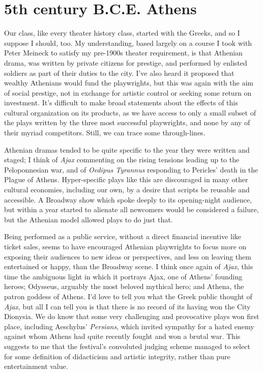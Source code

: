 \section*{5th century B.C.E. Athens}


Our class, like every theater history class, started with the Greeks, and so I suppose I
should, too. My understanding, based largely on a course I took with Peter Meineck to
satisfy my pre-1900s theater requirement, is that Athenian drama, was written by private
citizens for prestige, and performed by enlisted soldiers as part of their duties to the
city. I've also heard it proposed that wealthy Athenians would fund the playwrights, but
this was again with the aim of social prestige, not in exchange for artistic control or
seeking some return on investment. It's difficult to make broad statements about the
effects of this cultural organization on its products, as we have access to only a small
subset of the plays written by the three most successful playwrights, and none by any of
their myriad competitors. Still, we can trace some through-lines.

Athenian dramas tended to be quite specific to the year they were written and staged; I
think of \textit{Ajax} commenting on the rising tensions leading up to the Peloponnesian
war, and of \textit{Oedipus Tyrannus} responding to Pericles' death in the Plague of
Athens. Hyper-specific plays like this are discouraged in many other cultural economies,
including our own, by a desire that scripts be reusable and accessible. A Broadway show
which spoke deeply to its opening-night audience, but within a year started to alienate
all newcomers would be considered a failure, but the Athenian model allowed plays to do
just that.

Being performed as a public service, without a direct financial incentive like ticket
sales, seems to have encouraged Athenian playwrights to focus more on exposing their
audiences to new ideas or perspectives, and less on leaving them entertained or happy,
than the Broadway scene. I think once again of \textit{Ajax}, this time the ambiguous
light in which it portrays Ajax, one of Athens' founding heroes; Odysseus, arguably the
most beloved mythical hero; and Athena, the patron goddess of Athens. I'd love to tell you
what the Greek public thought of \textit{Ajax}, but all I can tell you is that there is no
record of its having won the City Dionysia. We do know that some very challenging and
provocative plays won first place, including Aeschylus' \textit{Persians}, which invited
sympathy for a hated enemy against whom Athens had quite recently fought and won a brutal
war. This suggests to me that the festival's convoluted judging scheme managed to select
for some definition of didacticism and artistic integrity, rather than pure entertainment
value.

